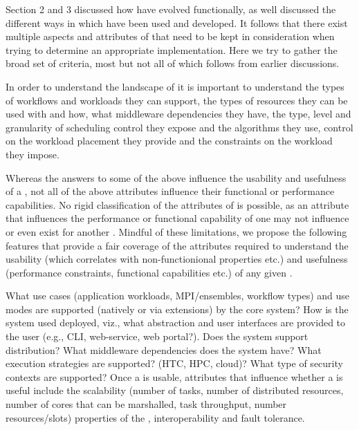 \documentclass{sig-alternate}
\begin{document}



Section 2 and 3 discussed how \pilotjobs have evolved functionally, as
well discussed the different ways in which \pilotjobs have been
used and developed. It follows that there exist multiple aspects and
attributes of \pilotjobs that need to be kept in consideration when
trying to determine an appropriate implementation.  Here we try to
gather the broad set of criteria, most but not all of which follows
from earlier discussions.

In order to understand the landscape of \pilotjobs it is important to
understand the types of workflows and workloads they can support, the
types of resources they can be used with and how, what middleware
dependencies they have, the type, level and granularity of scheduling
control they expose and the algorithms they use, control on the
workload placement they provide and the
constraints on the workload they impose. 

Whereas the answers to some of the above influence the usability and
usefulness of a \pilotjob, not all of the above attributes influence
their functional or performance capabilities.   No rigid classification of the attributes of
\pilotjobs is possible, as an attribute that influences the
performance or functional capability of one \pilotjob may not
influence or even exist for another \pilotjob. Mindful of these
limitations, we propose the following features that provide a fair
coverage of the attributes required to understand the usability (which
correlates with non-functionional properties etc.)  and usefulness
(performance constraints, functional capabilities etc.)  of any given
\pilotjob. 

What use cases (application workloads, MPI/ensembles, workflow types)
and use modes are supported (natively or via extensions) by the core
\pilotjob system?  How is the \pilotjob system used deployed, viz.,
what abstraction and user interfaces are provided to the user (e.g.,
CLI, web-service, web portal?). Does the \pilotjob system support
distribution? What middleware dependencies does the \pilotjob system
have?  What execution strategies are supported? (HTC, HPC, cloud)?
What type of security contexts are supported?  Once a \pilotjob is
usable, attributes that influence whether a \pilotjob is useful include
the scalability (number of tasks, number of distributed resources,
number of cores that can be marshalled, task throughput, number
resources/slots) properties of the \pilotjob, interoperability and
fault tolerance.
\end{document}
